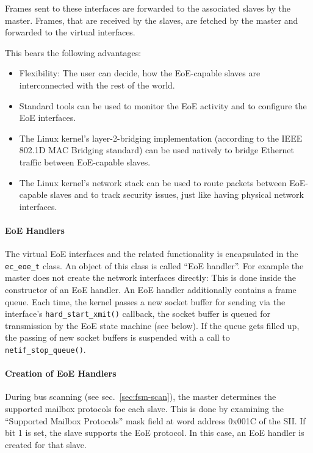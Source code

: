 \documentclass[a4paper,12pt,BCOR6mm,bibtotoc,idxtotoc]{scrbook}
\begin{document}
Frames sent to these interfaces are forwarded to the associated slaves by the
master. Frames, that are received by the slaves, are fetched by the master and
forwarded to the virtual interfaces.

This bears the following advantages:

\begin{itemize}

\item Flexibility: The user can decide, how the EoE-capable slaves are
interconnected with the rest of the world.

\item Standard tools can be used to monitor the EoE activity and to configure
the EoE interfaces.

\item The Linux kernel's layer-2-bridging implementation (according to the
IEEE 802.1D MAC Bridging standard) can be used natively to bridge Ethernet
traffic between EoE-capable slaves.

\item The Linux kernel's network stack can be used to route packets between
EoE-capable slaves and to track security issues, just like having physical
network interfaces.

\end{itemize}

\paragraph{EoE Handlers}

The virtual EoE interfaces and the related functionality is encapsulated in
the \lstinline+ec_eoe_t+ class. An object of this class is called ``EoE
handler''. For example the master does not create the network interfaces
directly: This is done inside the constructor of an EoE handler. An EoE
handler additionally contains a frame queue. Each time, the kernel passes a
new socket buffer for sending via the interface's
\lstinline+hard_start_xmit()+ callback, the socket buffer is queued for
transmission by the EoE state machine (see below). If the queue gets filled
up, the passing of new socket buffers is suspended with a call to
\lstinline+netif_stop_queue()+.

\paragraph{Creation of EoE Handlers}

During bus scanning (see sec.~\ref{sec:fsm-scan}), the master determines the
supported mailbox protocols foe each slave. This is done by examining the
``Supported Mailbox Protocols'' mask field at word address 0x001C of the
SII. If bit 1 is set, the slave supports the EoE protocol. In this
case, an EoE handler is created for that slave.
\end{document}
